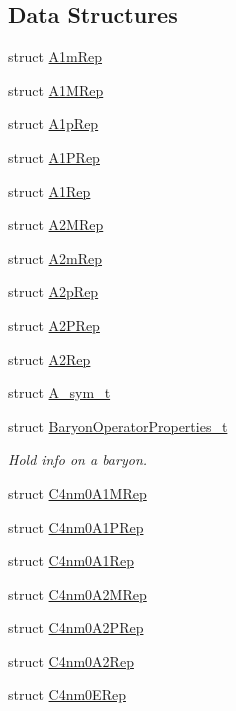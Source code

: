 \subsection*{Data Structures}
\begin{DoxyCompactItemize}
\item 
struct \mbox{\hyperlink{structHadron_1_1A1mRep}{A1m\+Rep}}
\item 
struct \mbox{\hyperlink{structHadron_1_1A1MRep}{A1\+M\+Rep}}
\item 
struct \mbox{\hyperlink{structHadron_1_1A1pRep}{A1p\+Rep}}
\item 
struct \mbox{\hyperlink{structHadron_1_1A1PRep}{A1\+P\+Rep}}
\item 
struct \mbox{\hyperlink{structHadron_1_1A1Rep}{A1\+Rep}}
\item 
struct \mbox{\hyperlink{structHadron_1_1A2MRep}{A2\+M\+Rep}}
\item 
struct \mbox{\hyperlink{structHadron_1_1A2mRep}{A2m\+Rep}}
\item 
struct \mbox{\hyperlink{structHadron_1_1A2pRep}{A2p\+Rep}}
\item 
struct \mbox{\hyperlink{structHadron_1_1A2PRep}{A2\+P\+Rep}}
\item 
struct \mbox{\hyperlink{structHadron_1_1A2Rep}{A2\+Rep}}
\item 
struct \mbox{\hyperlink{structHadron_1_1A__sym__t}{A\+\_\+sym\+\_\+t}}
\item 
struct \mbox{\hyperlink{structHadron_1_1BaryonOperatorProperties__t}{Baryon\+Operator\+Properties\+\_\+t}}
\begin{DoxyCompactList}\small\item\em Hold info on a baryon. \end{DoxyCompactList}\item 
struct \mbox{\hyperlink{structHadron_1_1C4nm0A1MRep}{C4nm0\+A1\+M\+Rep}}
\item 
struct \mbox{\hyperlink{structHadron_1_1C4nm0A1PRep}{C4nm0\+A1\+P\+Rep}}
\item 
struct \mbox{\hyperlink{structHadron_1_1C4nm0A1Rep}{C4nm0\+A1\+Rep}}
\item 
struct \mbox{\hyperlink{structHadron_1_1C4nm0A2MRep}{C4nm0\+A2\+M\+Rep}}
\item 
struct \mbox{\hyperlink{structHadron_1_1C4nm0A2PRep}{C4nm0\+A2\+P\+Rep}}
\item 
struct \mbox{\hyperlink{structHadron_1_1C4nm0A2Rep}{C4nm0\+A2\+Rep}}
\item 
struct \mbox{\hyperlink{structHadron_1_1C4nm0ERep}{C4nm0\+E\+Rep}}

\end{DoxyCompactItemize}
